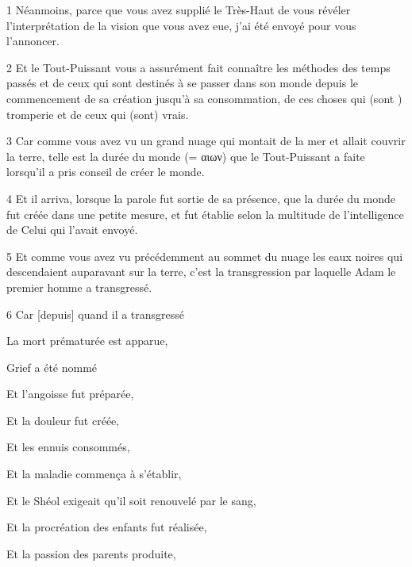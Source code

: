 \par 1 Néanmoins, parce que vous avez supplié le Très-Haut de vous révéler l'interprétation de la vision que vous avez eue, j'ai été envoyé pour vous l'annoncer.

\par 2 Et le Tout-Puissant vous a assurément fait connaître les méthodes des temps passés et de ceux qui sont destinés à se passer dans son monde depuis le commencement de sa création jusqu'à sa consommation, de ces choses qui (sont ) tromperie et de ceux qui (sont) vrais.

\par 3 Car comme vous avez vu un grand nuage qui montait de la mer et allait couvrir la terre, telle est la durée du monde (= αιων) que le Tout-Puissant a faite lorsqu'il a pris conseil de créer le monde.

\par 4 Et il arriva, lorsque la parole fut sortie de sa présence, que la durée du monde fut créée dans une petite mesure, et fut établie selon la multitude de l'intelligence de Celui qui l'avait envoyé.

\par 5 Et comme vous avez vu précédemment au sommet du nuage les eaux noires qui descendaient auparavant sur la terre, c'est la transgression par laquelle Adam le premier homme a transgressé.

\par 6 Car [depuis] quand il a transgressé

\par La mort prématurée est apparue,

\par Grief a été nommé

\par Et l'angoisse fut préparée,

\par Et la douleur fut créée,

\par Et les ennuis consommés,

\par Et la maladie commença à s'établir,

\par Et le Shéol exigeait qu'il soit renouvelé par le sang,

\par Et la procréation des enfants fut réalisée,

\par Et la passion des parents produite,

